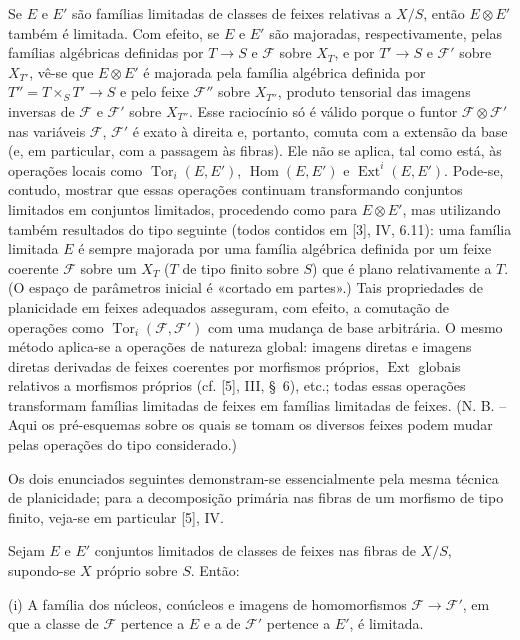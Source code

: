 Se $E$ e $E'$ são famílias limitadas de classes de feixes relativas a $X/S$,
então $E\otimes E'$ também é limitada. Com efeito, se $E$ e $E'$ são majoradas,
respectivamente, pelas famílias algébricas definidas por $T\longrightarrow S$ e
$\mathcal F$ sobre $X_T$, e por $T'\longrightarrow S$ e $\mathcal F'$ sobre
$X_{T'}$, vê-se que $E\otimes E'$ é majorada pela família algébrica definida por
$T''=T\times_S T'\longrightarrow S$ e pelo feixe $\mathcal F''$ sobre
$X_{T''}$, produto tensorial das imagens inversas de $\mathcal F$ e
$\mathcal F'$ sobre $X_{T''}$. Esse raciocínio só é válido porque o funtor
$\mathcal F\otimes\mathcal F'$ nas variáveis $\mathcal F$, $\mathcal F'$ é exato
à direita e, portanto, comuta com a extensão da base (e, em particular, com a
passagem às fibras). Ele não se aplica, tal como está, às operações locais como
$\operatorname{Tor}_i(E,E')$, $\operatorname{Hom}(E,E')$ e
$\operatorname{Ext}^i(E,E')$. Pode-se, contudo, mostrar que essas operações
continuam transformando conjuntos limitados em conjuntos limitados, procedendo
como para $E\otimes E'$, mas utilizando também resultados do tipo seguinte
(todos contidos em [3], IV, 6.11): uma família limitada $E$ é sempre majorada
por uma família algébrica definida por um feixe coerente $\mathcal F$ sobre um
$X_T$ ($T$ de tipo finito sobre $S$) que é plano relativamente a $T$. (O espaço
de parâmetros inicial é «cortado em partes».) Tais
propriedades de planicidade em feixes adequados asseguram, com efeito, a
comutação de operações como $\operatorname{Tor}_i(\mathcal F,\mathcal F')$
com uma mudança de base arbitrária. O mesmo método aplica-se a operações de
natureza global: imagens diretas e imagens diretas derivadas de feixes
coerentes por morfismos próprios, $\operatorname{Ext}$ globais relativos a
morfismos próprios (cf. [5], III, \S~6), etc.; todas essas operações
transformam famílias limitadas de feixes em famílias limitadas de feixes.
(N. B. -- Aqui os pré-esquemas sobre os quais se tomam os diversos feixes
podem mudar pelas operações do tipo considerado.)

Os dois enunciados seguintes demonstram-se essencialmente pela mesma técnica
de planicidade; para a decomposição primária nas fibras de um morfismo de tipo
finito, veja-se em particular [5], IV.

 Sejam $E$ e $E'$ conjuntos limitados de classes de
feixes nas fibras de $X/S$, supondo-se $X$ próprio sobre $S$. Então:

\medskip
\noindent (i) A família dos núcleos, conúcleos e imagens de homomorfismos
$\mathcal F\longrightarrow\mathcal F'$, em que a classe de $\mathcal F$
pertence a $E$ e a de $\mathcal F'$ pertence a $E'$, é limitada.


